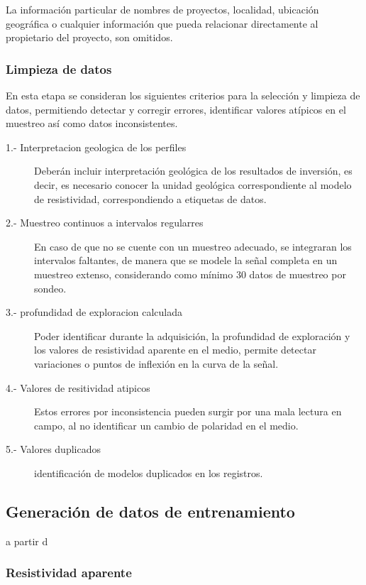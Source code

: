		La información particular de nombres de proyectos, localidad, ubicación geográfica o cualquier información que pueda relacionar directamente al propietario del proyecto, son omitidos. 
		
		\subsubsection{Limpieza de datos}
		
		En esta etapa se consideran los siguientes criterios para la selección y limpieza de datos, permitiendo detectar y corregir errores, identificar valores atípicos en el muestreo así como datos inconsistentes.
		
		\begin{description}
			\item[1.- Interpretacion geologica de los perfiles] Deberán incluir interpretación geológica de los resultados de inversión, es decir, es necesario conocer la unidad geológica correspondiente al modelo de resistividad, correspondiendo a etiquetas de datos. 
			\item[2.- Muestreo continuos a intervalos regularres] En caso de que no se cuente con un muestreo adecuado, se integraran los intervalos faltantes, de manera que se modele la señal completa en un muestreo extenso, considerando como mínimo 30 datos de muestreo por sondeo.  
			\item[3.- profundidad de exploracion calculada] Poder identificar durante la adquisición, la profundidad de exploración y los valores de resistividad aparente en el medio, permite detectar variaciones o puntos de inflexión en la curva de la señal.
			\item[4.- Valores de resitividad atipicos] Estos errores por inconsistencia pueden surgir por una mala lectura en campo, al no identificar un cambio de polaridad en el medio.
			\item[5.- Valores duplicados ] identificación de modelos duplicados en los registros.
		\end{description}
		
		
		
	\subsection{Generación de datos de entrenamiento}
	
	a partir d
		
		\subsubsection{Resistividad aparente}
		
